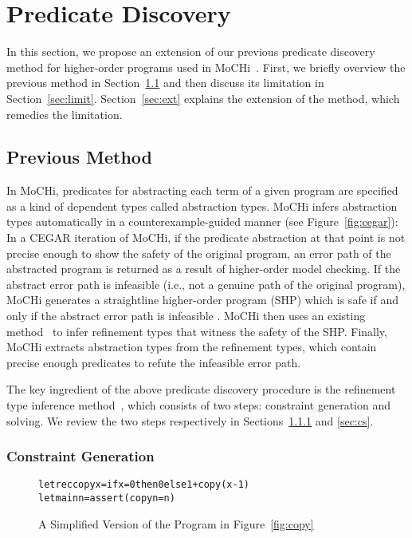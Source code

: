 

\section{Predicate Discovery}
\label{sec:refine}

In this section, we propose an extension of our previous predicate
discovery method for higher-order programs used in
MoCHi~\cite{KobayashiPLDI2011}.  First, we briefly overview the previous
method in Section~\ref{sec:prev} and then discuss its limitation in
Section~\ref{sec:limit}. Section~\ref{sec:ext} explains the extension of
the method, which remedies the limitation.

\subsection{Previous Method}
\label{sec:prev}

In MoCHi, predicates for abstracting each term of a given program are
specified as a kind of dependent types called abstraction types.  MoCHi
infers abstraction types automatically in a counterexample-guided manner
(see Figure~\ref{fig:cegar}): In a CEGAR iteration of MoCHi, if the
predicate abstraction at that point is not precise enough to show the
safety of the original program, an error path of the abstracted program
is returned as a result of higher-order model checking.  If the abstract
error path is infeasible (i.e., not a genuine path of the original
program), MoCHi generates a straightline higher-order program (SHP)
which is safe if and only if the abstract error path is infeasible .
MoCHi then uses an existing method~\cite{Unno2009} to infer refinement
types that witness the safety of the SHP.  Finally, MoCHi extracts
abstraction types from the refinement types, which contain precise
enough predicates to refute the infeasible error path.

The key ingredient of the above predicate discovery procedure is the
refinement type inference
method~\cite{Unno2009,Terauchi2010,KobayashiPLDI2011}, which consists of
two steps: constraint generation and solving.  We review the two steps
respectively in Sections~\ref{sec:cg} and \ref{sec:cs}.

\subsubsection{Constraint Generation}
\label{sec:cg}

\begin{figure}[t]
\begin{alltt}
letrec copy x = if x=0 then 0 else 1 + copy (x-1)
let main n = assert (copy n = n)
\end{alltt}
\caption{A Simplified Version of the Program in Figure~\ref{fig:copy}}
\label{fig:copy2}
\end{figure}

